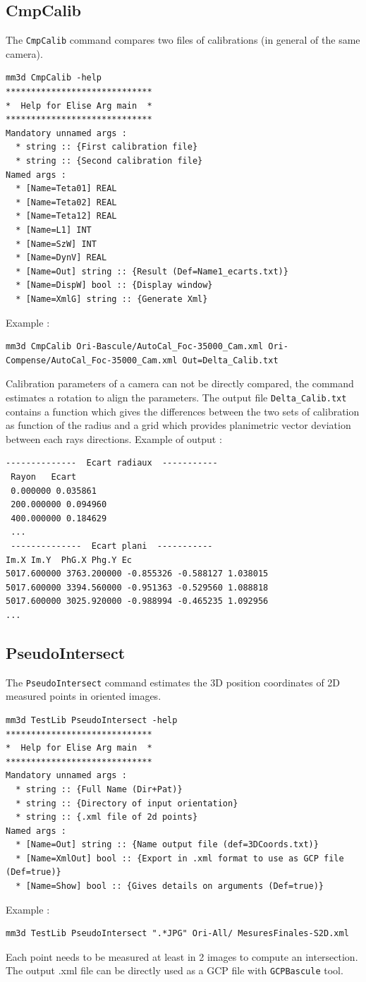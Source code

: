\subsection{CmpCalib}
The {\tt CmpCalib} command compares two files of calibrations (in general of the same camera).

\begin{verbatim}
mm3d CmpCalib -help
*****************************
*  Help for Elise Arg main  *
*****************************
Mandatory unnamed args : 
  * string :: {First calibration file}
  * string :: {Second calibration file}
Named args : 
  * [Name=Teta01] REAL
  * [Name=Teta02] REAL
  * [Name=Teta12] REAL
  * [Name=L1] INT
  * [Name=SzW] INT
  * [Name=DynV] REAL
  * [Name=Out] string :: {Result (Def=Name1_ecarts.txt)}
  * [Name=DispW] bool :: {Display window}
  * [Name=XmlG] string :: {Generate Xml}
\end{verbatim}

Example :
\begin{verbatim}
mm3d CmpCalib Ori-Bascule/AutoCal_Foc-35000_Cam.xml Ori-Compense/AutoCal_Foc-35000_Cam.xml Out=Delta_Calib.txt
\end{verbatim}

Calibration parameters of a camera can not be directly compared, the command estimates a rotation to align the parameters.
The output file {\tt Delta\_Calib.txt} contains a function which gives the differences between the two sets of calibration as function of the radius and 
a grid which provides planimetric vector deviation between each rays directions. Example of output :

\begin{verbatim}
--------------  Ecart radiaux  -----------
 Rayon   Ecart
 0.000000 0.035861
 200.000000 0.094960
 400.000000 0.184629
 ...
 --------------  Ecart plani  -----------
Im.X Im.Y  PhG.X Phg.Y Ec
5017.600000 3763.200000 -0.855326 -0.588127 1.038015
5017.600000 3394.560000 -0.951363 -0.529560 1.088818
5017.600000 3025.920000 -0.988994 -0.465235 1.092956
...
\end{verbatim}

\subsection{PseudoIntersect}
The {\tt PseudoIntersect} command estimates the 3D position coordinates of 2D measured points in oriented images.

\begin{verbatim}
mm3d TestLib PseudoIntersect -help
*****************************
*  Help for Elise Arg main  *
*****************************
Mandatory unnamed args : 
  * string :: {Full Name (Dir+Pat)}
  * string :: {Directory of input orientation}
  * string :: {.xml file of 2d points}
Named args : 
  * [Name=Out] string :: {Name output file (def=3DCoords.txt)}
  * [Name=XmlOut] bool :: {Export in .xml format to use as GCP file (Def=true)}
  * [Name=Show] bool :: {Gives details on arguments (Def=true)}
\end{verbatim}

Example :
\begin{verbatim}
mm3d TestLib PseudoIntersect ".*JPG" Ori-All/ MesuresFinales-S2D.xml
\end{verbatim}

Each point needs to be measured at least in 2 images to compute an intersection.
The output .xml file can be directly used as a GCP file with {\tt GCPBascule} tool.

